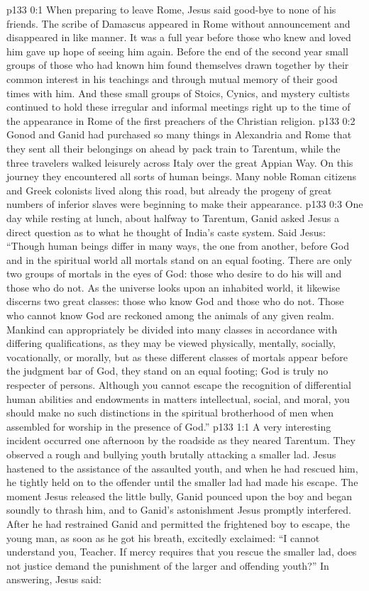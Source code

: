 \author{Midwayer Commission}
\vs p133 0:1 When preparing to leave Rome, Jesus said good\hyp{}bye to none of his friends. The scribe of Damascus appeared in Rome without announcement and disappeared in like manner. It was a full year before those who knew and loved him gave up hope of seeing him again. Before the end of the second year small groups of those who had known him found themselves drawn together by their common interest in his teachings and through mutual memory of their good times with him. And these small groups of Stoics, Cynics, and mystery cultists continued to hold these irregular and informal meetings right up to the time of the appearance in Rome of the first preachers of the Christian religion.
\pc \vs p133 0:2 Gonod and Ganid had purchased so many things in Alexandria and Rome that they sent all their belongings on ahead by pack train to Tarentum, while the three travelers walked leisurely across Italy over the great Appian Way. On this journey they encountered all sorts of human beings. Many noble Roman citizens and Greek colonists lived along this road, but already the progeny of great numbers of inferior slaves were beginning to make their appearance.
\vs p133 0:3 One day while resting at lunch, about halfway to Tarentum, Ganid asked Jesus a direct question as to what he thought of India’s caste system. Said Jesus: \textcolor{ubdarkred}{“Though human beings differ in many ways, the one from another, before God and in the spiritual world all mortals stand on an equal footing. There are only two groups of mortals in the eyes of God: those who desire to do his will and those who do not. As the universe looks upon an inhabited world, it likewise discerns two great classes: those who know God and those who do not. Those who cannot know God are reckoned among the animals of any given realm. Mankind can appropriately be divided into many classes in accordance with differing qualifications, as they may be viewed physically, mentally, socially, vocationally, or morally, but as these different classes of mortals appear before the judgment bar of God, they stand on an equal footing; God is truly no respecter of persons. Although you cannot escape the recognition of differential human abilities and endowments in matters intellectual, social, and moral, you should make no such distinctions in the spiritual brotherhood of men when assembled for worship in the presence of God.”}
\vs p133 1:1 A very interesting incident occurred one afternoon by the roadside as they neared Tarentum. They observed a rough and bullying youth brutally attacking a smaller lad. Jesus hastened to the assistance of the assaulted youth, and when he had rescued him, he tightly held on to the offender until the smaller lad had made his escape. The moment Jesus released the little bully, Ganid pounced upon the boy and began soundly to thrash him, and to Ganid’s astonishment Jesus promptly interfered. After he had restrained Ganid and permitted the frightened boy to escape, the young man, as soon as he got his breath, excitedly exclaimed: “I cannot understand you, Teacher. If mercy requires that you rescue the smaller lad, does not justice demand the punishment of the larger and offending youth?” In answering, Jesus said:
